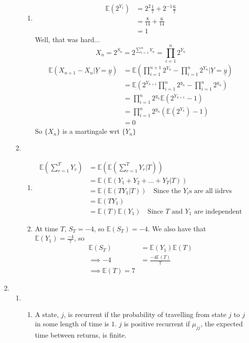 \documentclass{article}
\begin{document}
\begin{enumerate}
\begin{enumerate}
\begin{enumerate}
\item
\begin{align*}
\mathbb{E}(2^{Y_1}) &= 2^2\frac{1}{7} + 2^{-1}\frac{6}{7}\\
&= \frac{8}{14} + \frac{6}{14}\\
&=1
\end{align*}
Well, that was hard...
$$
X_n = 2^{S_n} = 2^{\sum\limits_{i=1}^n Y_n} = \prod^n_{i=1}2^{Y_n}
$$
\begin{align*}
\mathbb{E}(X_{n+1}-X_n| \underline{Y} = \underline{y})& = \mathbb{E}(\prod^{n+1}_{i=1}2^{Y_n} - \prod^n_{i=1}2^{Y_n} | \underline{Y} = \underline{y})\\
&= \mathbb{E}(2^{Y_{n+1}}\prod^{n}_{i=1}2^{y_n} - \prod^n_{i=1}2^{y_n})\\
&= \prod^n_{i=1}2^{y_n} \mathbb{E}(2^{Y_{n+1}}-1)\\
&= \prod^n_{i=1}2^{y_n} (\mathbb{E}(2^{Y_1}) -1)\\
&= 0
\end{align*}
So $\{X_n\}$ is a martingale wrt $\{Y_n\}$

\end{enumerate}
\item
\begin{enumerate}
\item
\begin{align*}
\mathbb{E}(\sum^T_{r=1}Y_r) &= \mathbb{E}(\mathbb{E}(\sum^T_{r=1}Y_r|T))\\
&= \mathbb{E}(\mathbb{E}(Y_1+Y_2+\dots+Y_T|T))\\
&= \mathbb{E}(\mathbb{E}(TY_1|T)) \quad \mbox{Since the $Y_i$s are all iidrvs}\\
&= \mathbb{E}(TY_1)\\
&= \mathbb{E}(T)\mathbb{E}(Y_1) \quad \mbox{Since $T$ and $Y_1$ are independent}
\end{align*}
\item
At time $T$, $S_T = -4$, so $\mathbb{E}(S_T) = -4$. We also have that $\mathbb{E}(Y_1) = \frac{-4}{7}$, so
\begin{align*}
\mathbb{E}(S_T)&=\mathbb{E}(Y_1)\mathbb{E}(T)\\
\implies -4 &= \frac{-4\mathbb{E}(T)}{7}\\
\implies \mathbb{E}(T) = 7
\end{align*}
\end{enumerate}
\end{enumerate}
\clearpage
\item
\begin{enumerate}
\item
\begin{enumerate}
\item A state, $j$, is recurrent if the probability of travelling from state $j$ to $j$ in some length of time is $1$. $j$ is positive recurrent if $\mu_{jj}$, the expected time between returns, is finite.


\end{enumerate}
\end{enumerate}
\end{enumerate}
\end{document}
